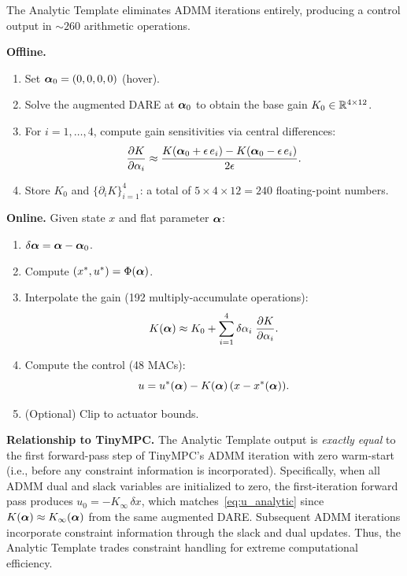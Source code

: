 The Analytic Template eliminates ADMM iterations entirely,
producing a control output in ${\sim}260$ arithmetic operations.

\textbf{Offline.}
\begin{enumerate}
  \item Set $\bm{\alpha}_0 = (0, 0, 0, 0)$ (hover).
  \item Solve the augmented DARE at $\bm{\alpha}_0$ to obtain
    the base gain $K_0 \in \mathbb{R}^{4 \times 12}$.
  \item For $i = 1, \ldots, 4$, compute gain sensitivities
    via central differences:
    \begin{equation}\label{eq:dK}
      \frac{\partial K}{\partial \alpha_i} \approx
      \frac{K(\bm{\alpha}_0 + \epsilon \, e_i) - K(\bm{\alpha}_0 - \epsilon \, e_i)}
           {2\epsilon}.
    \end{equation}
  \item Store $K_0$ and $\{\partial_i K\}_{i=1}^4$:
    a total of $5 \times 4 \times 12 = 240$ floating-point numbers.
\end{enumerate}

\textbf{Online.}
Given state $x$ and flat parameter $\bm{\alpha}$:
\begin{enumerate}
  \item $\delta \bm{\alpha} = \bm{\alpha} - \bm{\alpha}_0$.
  \item Compute $(x^*, u^*) = \Phi(\bm{\alpha})$.
  \item Interpolate the gain (192 multiply-accumulate operations):
    \begin{equation}\label{eq:K_interp}
      K(\bm{\alpha}) \approx K_0 + \sum_{i=1}^{4} \delta\alpha_i \; \frac{\partial K}{\partial \alpha_i}.
    \end{equation}
  \item Compute the control (48 MACs):
    \begin{equation}\label{eq:u_analytic}
      u = u^*(\bm{\alpha}) - K(\bm{\alpha}) \, (x - x^*(\bm{\alpha})).
    \end{equation}
  \item (Optional) Clip to actuator bounds.
\end{enumerate}

\textbf{Relationship to TinyMPC.}
The Analytic Template output is \emph{exactly equal} to
the first forward-pass step of TinyMPC's ADMM iteration
with zero warm-start (i.e., before any constraint information
is incorporated).
Specifically, when all ADMM dual and slack variables are initialized
to zero, the first-iteration forward pass produces
$u_0 = -K_\infty \, \delta x$,
which matches~\eqref{eq:u_analytic} since $K(\bm{\alpha}) \approx K_\infty(\bm{\alpha})$
from the same augmented DARE.
Subsequent ADMM iterations incorporate constraint information
through the slack and dual updates.
Thus, the Analytic Template trades constraint handling for
extreme computational efficiency.

